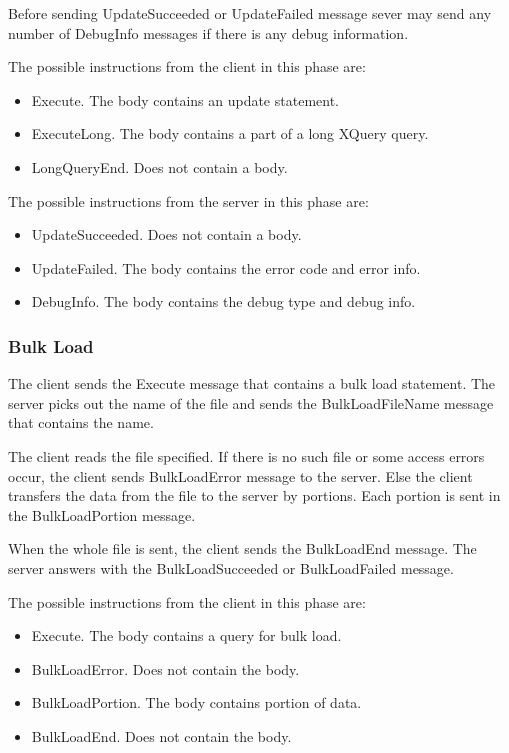 \documentclass[a4paper,12pt]{article}
\begin{document}
Before sending UpdateSucceeded or UpdateFailed message sever may send any number of DebugInfo messages if there is any debug information.

The possible instructions from the client in this phase are:
\begin{itemize}
\item Execute. The body contains an update statement.
\item ExecuteLong. The body contains a part of a long XQuery query.
\item LongQueryEnd. Does not contain a body.
\end{itemize}

The possible instructions from the server in this phase are:
\begin{itemize}
\item UpdateSucceeded. Does not contain a body.
\item UpdateFailed. The body contains the error code and error info.
\item DebugInfo. The body contains the debug type and debug info.
\end{itemize}

\subsubsection{Bulk Load}

The client sends the Execute message that contains a bulk load statement. The server picks out the name of the file and sends the BulkLoadFileName message that contains the name.

The client reads the file specified. If there is no such file or some access errors occur, the client sends BulkLoadError message to the server. Else the client transfers the data from the file to the server by portions. Each portion is sent in the BulkLoadPortion message.

When the whole file is sent, the client sends the BulkLoadEnd message. The server answers with the BulkLoadSucceeded or BulkLoadFailed message.

The possible instructions from the client in this phase are:
\begin{itemize}
\item Execute. The body contains a query for bulk load.
\item BulkLoadError. Does not contain the body.    
\item BulkLoadPortion. The body contains portion of data.
\item BulkLoadEnd. Does not contain the body.
\end{itemize}
\end{document}
